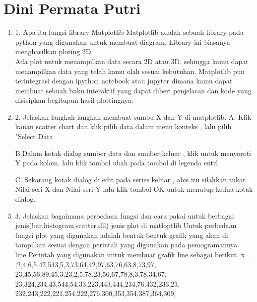 ﻿\section{Dini Permata Putri}
\begin{enumerate}


\item 1. Apa itu fungsi library Matplotlib
Matplotlib adalah sebuah library pada python yang digunakan untuk membuat diagram. Library ini biasanya menghasilkan ploting 2D.\\

Ada plot untuk menampilkan data secara 2D atau 3D. sehingga kamu dapat menampilkan data yang telah kamu olah sesuai kebutuhan. Matplotlib pun terintegrasi dengan ipython notebook atau jupyter dimana kamu dapat membuat sebuah buku interaktif yang dapat diberi penjelasan dan kode yang disisipkan begitupun hasil plottingnya.\\

\item 2. Jelaskan langkah-langkah membuat sumbu X dan Y di matplotlib.
A. Klik kanan scatter chart dan klik pilih data dalam menu konteks , lalu pilih "Select Data

B.Dalam kotak dialog sumber data dan sumber keluar , klik untuk menyoroti Y pada kolom. lalu klik tombol ubah pada tombol di legenda entrl.

C. Sekarang kotak dialog di edit pada series keluar , abis itu silahkan tukar Nilai seri X dan Nilai seri Y lalu klik tombol OK untuk menutup kedua kotak dialog.\\

\item 3. Jelaskan bagaimana perbedaan fungsi dan cara pakai untuk berbagai jenis(bar,histogram,scatter.dll) jenis plot di matloptlib
Untuk perbedaan fungsi plot yang digunakan adalah bentuk bentuk grafik yang akan di tampilkan sesuai dengan perintah yang digunakan pada pemogramannya.\\

line
    Perintah yang digunakan untuk membuat grafik line sebagai berikut.
x = [2,4,6,5,42,543,5,3,73,64,42,97,63,76,63,8,73,97,\\
23,45,56,89,45,3,23,2,5,78,23,56,67,78,8,3,78,34,67,\\
23,324,234,43,544,54,33,223,443,444,234,76,432,233,23,\\
232,243,222,221,254,222,276,300,353,354,387,364,309]\\




\end{enumerate}
